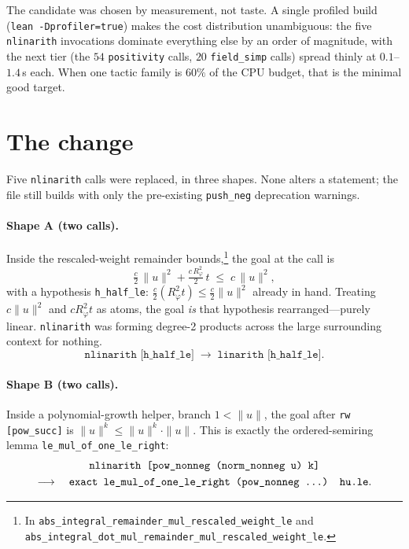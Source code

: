 \documentclass[11pt]{article}
\begin{document}
The candidate was chosen by measurement, not taste. A single profiled build
(\texttt{lean -Dprofiler=true}) makes the cost distribution unambiguous: the
five \texttt{nlinarith} invocations dominate everything else by an order of
magnitude, with the next tier (the $54$ \texttt{positivity} calls, $20$
\texttt{field\_simp} calls) spread thinly at $0.1$--$1.4$\,s each. When one tactic
family is $60\%$ of the CPU budget, that is the minimal good target.

\section{The change}

Five \texttt{nlinarith} calls were replaced, in three shapes. None alters a
statement; the file still builds with only the pre-existing \texttt{push\_neg}
deprecation warnings.

\paragraph{Shape A (two calls).} Inside the rescaled-weight remainder
bounds,\footnote{In \texttt{abs\_integral\_\allowbreak remainder\_mul\_\allowbreak rescaled\_weight\_le}
and \texttt{abs\_integral\_\allowbreak dot\_mul\_\allowbreak remainder\_mul\_\allowbreak rescaled\_weight\_le}.} the
goal at the call is
\[
  \tfrac{c}{2}\,\|u\|^2 + \tfrac{c\,R_\varphi^2}{2}\,t \;\leq\; c\,\|u\|^2,
\]
with a hypothesis \texttt{h\_half\_le}:
$\tfrac{c}{2}(R_\varphi^2 t) \leq \tfrac{c}{2}\|u\|^2$ already in hand. Treating
$c\|u\|^2$ and $c R_\varphi^2 t$ as atoms, the goal \emph{is} that hypothesis
rearranged---purely linear. \texttt{nlinarith} was forming degree-2 products
across the large surrounding context for nothing.
\[
  \texttt{nlinarith [h\_half\_le]} \;\longrightarrow\; \texttt{linarith [h\_half\_le]}.
\]

\paragraph{Shape B (two calls).} Inside a polynomial-growth helper, branch
$1 < \|u\|$, the goal after \texttt{rw [pow\_succ]} is
$\|u\|^k \leq \|u\|^k \cdot \|u\|$. This is exactly the ordered-semiring lemma
\texttt{le\_mul\_of\_one\_le\_right}:
\begin{gather*}
  \texttt{nlinarith [pow\_nonneg (norm\_nonneg u) k]} \\
  \longrightarrow\quad
  \texttt{exact le\_mul\_of\_one\_le\_right (pow\_nonneg \dots) hu.le}.
\end{gather*}
\end{document}
